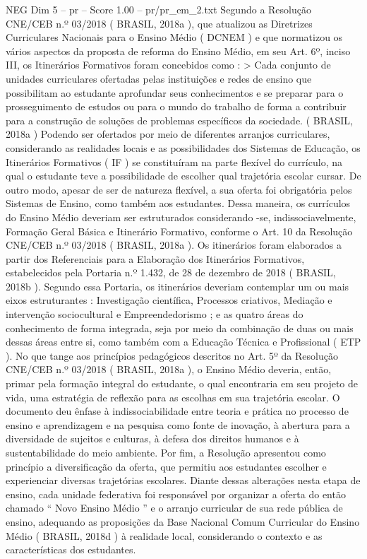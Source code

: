 \begin{textsample}{NEG Dim 5 – pr – Score 1.00 – pr/pr\_em\_2.txt}
Segundo a Resolução CNE/CEB n.º 03/2018 ( BRASIL, 2018a ), que atualizou as Diretrizes Curriculares Nacionais para o Ensino Médio ( DCNEM ) e que normatizou os vários aspectos da proposta de reforma do Ensino Médio, em seu Art. 6º, inciso III, os Itinerários Formativos foram concebidos como : > Cada conjunto de unidades curriculares ofertadas pelas instituições e redes de ensino que possibilitam ao estudante aprofundar seus conhecimentos e se preparar para o prosseguimento de estudos ou para o mundo do trabalho de forma a contribuir para a construção de soluções de problemas específicos da sociedade. ( BRASIL, 2018a ) Podendo ser ofertados por meio de diferentes arranjos curriculares, considerando as realidades locais e as possibilidades dos Sistemas de Educação, os Itinerários Formativos ( IF ) se constituíram na parte flexível do currículo, na qual o estudante teve a possibilidade de escolher qual trajetória escolar cursar.
De outro modo, apesar de ser de natureza flexível, a sua oferta foi obrigatória pelos Sistemas de Ensino, como também aos estudantes.
Dessa maneira, os currículos do Ensino Médio deveriam ser estruturados considerando -se, indissociavelmente, Formação Geral Básica e Itinerário Formativo, conforme o Art. 10 da Resolução CNE/CEB n.º 03/2018 ( BRASIL, 2018a ).
Os itinerários foram elaborados a partir dos Referenciais para a Elaboração dos Itinerários Formativos, estabelecidos pela Portaria n.º 1.432, de 28 de dezembro de 2018 ( BRASIL, 2018b ).
Segundo essa Portaria, os itinerários deveriam contemplar um ou mais eixos estruturantes : Investigação científica, Processos criativos, Mediação e intervenção sociocultural e Empreendedorismo ; e as quatro áreas do conhecimento de forma integrada, seja por meio da combinação de duas ou mais dessas áreas entre si, como também com a Educação Técnica e Profissional ( ETP ).
No que tange aos princípios pedagógicos descritos no Art. 5º da Resolução CNE/CEB n.º 03/2018 ( BRASIL, 2018a ), o Ensino Médio deveria, então, primar pela formação integral do estudante, o qual encontraria em seu projeto de vida, uma estratégia de reflexão para as escolhas em sua trajetória escolar.
O documento deu ênfase à indissociabilidade entre teoria e prática no processo de ensino e aprendizagem e na pesquisa como fonte de inovação, à abertura para a diversidade de sujeitos e culturas, à defesa dos direitos humanos e à sustentabilidade do meio ambiente.
Por fim, a Resolução apresentou como princípio a diversificação da oferta, que permitiu aos estudantes escolher e experienciar diversas trajetórias escolares.
Diante dessas alterações nesta etapa de ensino, cada unidade federativa foi responsável por organizar a oferta do então chamado “ Novo Ensino Médio ” e o arranjo curricular de sua rede pública de ensino, adequando as proposições da Base Nacional Comum Curricular do Ensino Médio ( BRASIL, 2018d ) à realidade local, considerando o contexto e as características dos estudantes.

\end{textsample}
